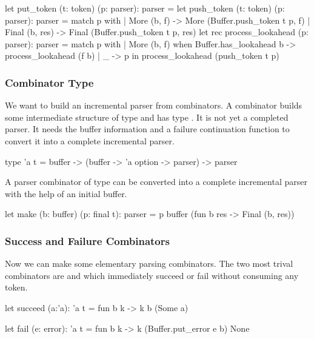 \begin{ocaml}
  let put_token (t: token) (p: parser): parser =
    let push_token (t: token) (p: parser): parser =
      match p with
      | More (b, f) ->
          More (Buffer.push_token t p, f)
      | Final (b, res) ->
          Final (Buffer.push_token t p, res)
    let rec process_lookahead (p: parser): parser =
      match p with
      | More (b, f) when Buffer.has_lookahead b ->
          process_lookahead (f b)
      | _ ->
          p
    in
    process_lookahead (push_token t p)
\end{ocaml}



\subsubsection{Combinator Type}

We want to build an incremental parser from combinators. A combinator builds
some intermediate structure of type  and has type . It is
not yet a completed parser. It needs the buffer information and a failure
continuation function to convert it into a complete incremental parser.

\begin{ocaml}
  type 'a t =
    buffer -> (buffer -> 'a option -> parser) -> parser
\end{ocaml}


A parser combinator of type  can be converted into a complete
incremental parser with the help of an initial buffer.

\begin{ocaml}
  let make (b: buffer) (p: final t): parser =
    p buffer (fun b res -> Final (b, res))
\end{ocaml}





\subsubsection{Success and Failure Combinators}


Now we can make some elementary parsing combinators. The two most trival
combinators are  and  which immediately succeed or
fail without consuming any token.

\begin{ocaml}
  let succeed (a:'a): 'a t =
     fun b k -> k b (Some a)

  let fail (e: error): 'a t =
     fun b k -> k (Buffer.put_error e b) None
\end{ocaml}



